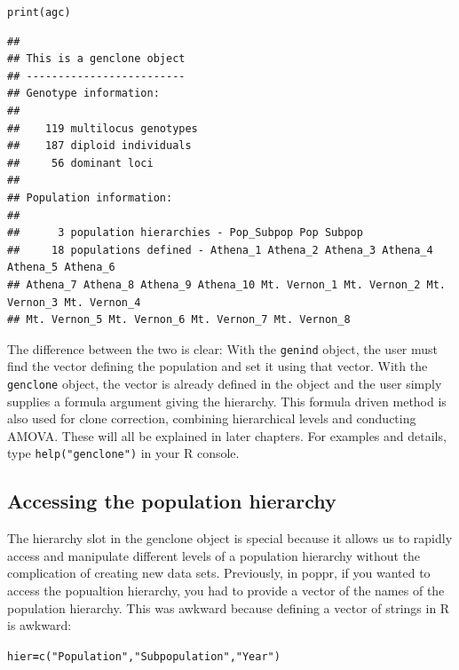 \documentclass[letterpaper]{article}\usepackage[]{graphicx}\usepackage[]{color}
\makeatletter
\newcommand{\hlstr}[1]{\textcolor[rgb]{0.651,0.522,0}{#1}}%
\newcommand{\hlstd}[1]{\textcolor[rgb]{0,0,0}{#1}}%
\newcommand{\hlkwb}[1]{\textcolor[rgb]{0.502,0.502,0.753}{\textbf{#1}}}%
\newcommand{\hlkwd}[1]{\textcolor[rgb]{0,0.267,0.4}{#1}}%
\newenvironment{kframe}{%
 \def\at@end@of@kframe{}%
 \ifinner\ifhmode%
  \def\at@end@of@kframe{\end{minipage}}%
  \begin{minipage}{\columnwidth}%
 \fi\fi%
 \def\FrameCommand##1{\hskip\@totalleftmargin \hskip-\fboxsep
 \colorbox{shadecolor}{##1}\hskip-\fboxsep
     \hskip-\linewidth \hskip-\@totalleftmargin \hskip\columnwidth}%
 \MakeFramed {\advance\hsize-\width
   \@totalleftmargin\z@ \linewidth\hsize
   \@setminipage}}%
 {\par\unskip\endMakeFramed%
 \at@end@of@kframe}
\newenvironment{knitrout}{}{} %
\makeatother
\begin{document}
\begin{knitrout}
\begin{kframe}
\begin{alltt}
\hlkwd{print}\hlstd{(agc)}
\end{alltt}
\begin{verbatim}
## 
## This is a genclone object
## -------------------------
## Genotype information:
## 
##    119 multilocus genotypes
##    187 diploid individuals
##     56 dominant loci
## 
## Population information:
## 
##      3 population hierarchies - Pop_Subpop Pop Subpop
##     18 populations defined - Athena_1 Athena_2 Athena_3 Athena_4 Athena_5 Athena_6 
## Athena_7 Athena_8 Athena_9 Athena_10 Mt. Vernon_1 Mt. Vernon_2 Mt. Vernon_3 Mt. Vernon_4 
## Mt. Vernon_5 Mt. Vernon_6 Mt. Vernon_7 Mt. Vernon_8
\end{verbatim}
\end{kframe}
\end{knitrout}


The difference between the two is clear: With the \texttt{genind} object, the
user must find the vector defining the population and set it using that vector.
With the \texttt{genclone} object, the vector is already defined in the object
and the user simply supplies a formula argument giving the hierarchy. This 
formula driven method is also used for clone correction, combining hierarchical
levels and conducting AMOVA. These will all be explained in later chapters. For
examples and details, type \texttt{help("genclone")} in your R console.

%
\subsection{Accessing the population hierarchy}
\label{intro:genclone:access}

The hierarchy slot in the genclone object is special because it allows us to
rapidly access and manipulate different levels of a population hierarchy without
the complication of creating new data sets. Previously, in poppr, if you wanted
to access the popualtion hierarchy, you had to provide a vector of the names
of the population hierarchy. This was awkward because defining a vector of
strings in R is awkward:

\begin{knitrout}\footnotesize
{}\color{fgcolor}\begin{kframe}
\begin{alltt}
\hlstd{hier} \hlkwb{=} \hlkwd{c}\hlstd{(}\hlstr{"Population"}\hlstd{,} \hlstr{"Subpopulation"}\hlstd{,} \hlstr{"Year"}\hlstd{)}
\end{alltt}
\end{kframe}
\end{knitrout}
\end{document}
